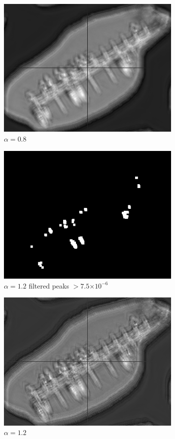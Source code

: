 \documentclass[12pt]{article}
\providecommand{\e}[1]{\ensuremath{\times 10^{#1}}}
\begin{document}
\begin{figure}
\centering
\includegraphics[width=0.80\textwidth]{v2/boats_a08.png}
\caption{\(\alpha=0.8\)}
\label{a08}
\end{figure}

\begin{figure}
\centering
\includegraphics[width=0.80\textwidth]{v2/boats_a12_peak.png}
\caption{\(\alpha=1.2\) filtered peaks \(> 7.5\e{-6}\)}
\label{a12peak}
\end{figure}

\begin{figure}
\centering
\includegraphics[width=0.80\textwidth]{v2/boats_a12.png}
\caption{\(\alpha=1.2\)}
\label{a12}
\end{figure}
\end{document}

